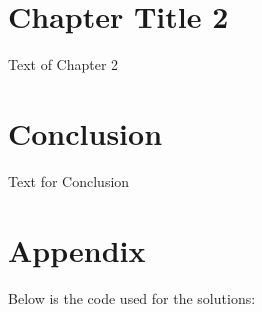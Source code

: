 \documentclass[12pt]{article}
\begin{document}
\newpage

\section{Chapter Title 2}
\noindent
Text of Chapter 2

\newpage

\section{Conclusion}
\noindent
Text for Conclusion

\newpage
\section{Appendix}
\noindent
Below is the code used for the solutions:

\end{document}
